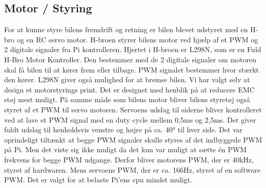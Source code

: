 \subsection{Motor / Styring}

For at kunne styre bilens fremdrift og retning er bilen blevet udstyret med en H-bro og en RC servo motor.
H-broen styrer bilens motor ved hjælp af et PWM og 2 digitale signaler fra Pi kontrolleren. Hjertet i H-broen er L298N\cite{lib:L298N_datablad}, som er en Fuld H-Bro Motor Kontroller. Den bestemmer med de 2 digitale signaler om motoren skal få bilen til at kører frem eller tilbage. PWM signalet bestemmer hvor stærkt den kører. L298N giver også mulighed for at bremse bilen. Vi har valgt selv at design et motorstyrings print. Det er designet med henblik på at reducere EMC støj mest muligt.
På samme måde som bilens motor bliver bilens styretøj også styret af et PWM til servo motoren. Servoens udslag til siderne bliver kontrolleret ved at lave et PWM signal med en duty cycle mellem 0,5ms og 2,5ms. Det giver fuldt udslag til henholdsvis venstre og højre på ca. 40\si{\degree} til hver side.
Det var oprindeligt tiltænkt at begge PWM signaler skulle styres af det indbyggede PWM på Pi. Men det viste sig ikke muligt da det kun var muligt at sætte én PWM frekvens for begge PWM udgange. Derfor bliver motorens PWM, der er 40kHz, styret af hardwaren. Mens servoens PWM, der er ca. 166Hz, styret af en software PWM. Det er valgt for at belaste Pi'ens cpu mindst muligt.
